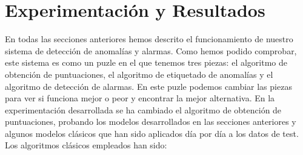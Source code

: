 \chapter{Experimentación y Resultados}
\label{chapter:experimentacion-resultados}

En todas las secciones anteriores hemos descrito el funcionamiento de nuestro sistema de detección de anomalías y alarmas. Como hemos podido comprobar, este sistema es como un puzle en el que tenemos tres piezas: el algoritmo de obtención de puntuaciones, el algoritmo de etiquetado de anomalías y el algoritmo de detección de alarmas. En este puzle podemos cambiar las piezas para ver si funciona mejor o peor y encontrar la mejor alternativa. En la experimentación desarrollada se ha cambiado el algoritmo de obtención de puntuaciones, probando los modelos desarrollados en las secciones anteriores y algunos modelos clásicos que han sido aplicados día por día a los datos de test. Los algoritmos clásicos empleados han sido: 
